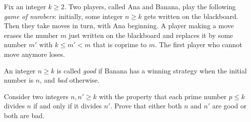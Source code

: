 Fix an integer $k \geq 2$. Two players, called Ana and Banana, play the following \emph{game of numbers}: initially, some integer $n \geq k$ gets written on the blackboard. Then they take moves in turn, with Ana beginning. A player making a move erases the number $m$ just written on the blackboard and replaces it by some number $m'$ with $k \leq m' < m$ that is coprime to $m$. The first player who cannot move anymore loses.

An integer $n \geq k$ is called \emph{good} if Banana has a winning strategy when the initial number is $n$, and \emph{bad} otherwise.

Consider two integers $n, n' \geq k$ with the property that each prime number $p \leq k$ divides $n$ if and only if it divides $n'$. Prove that either both $n$ and $n'$ are good or both are bad.
